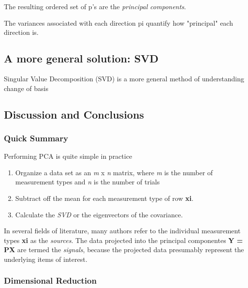 The resulting ordered set of p's are the \emph{principal components}.

The variances associated with each direction pi quantify how "principal"
each direction is.

\hypertarget{a-more-general-solution-svd}{%
\subsection{A more general solution:
SVD}\label{a-more-general-solution-svd}}

Singular Value Decomposition (SVD) is a more general method of
understanding change of basis

\hypertarget{discussion-and-conclusions}{%
\subsection{Discussion and
Conclusions}\label{discussion-and-conclusions}}

\hypertarget{quick-summary}{%
\subsubsection{Quick Summary}\label{quick-summary}}

Performing PCA is quite simple in practice

\begin{enumerate}
\def\labelenumi{\arabic{enumi}.}
\item
  Organize a data set as an \emph{m} x \emph{n} matrix, where \emph{m}
  is the number of measurement types and \emph{n} is the number of
  trials
\item
  Subtract off the mean for each measurement type of row \textbf{xi}.
\item
  Calculate the \emph{SVD} or the eigenvectors of the covariance.
\end{enumerate}

In several fields of literature, many authors refer to the individual
measurement types \textbf{xi} as the \emph{sources}. The data projected
into the principal componentes \textbf{Y = PX} are termed the
\emph{signals}, because the projected data presumably represent the
underlying items of interest.

\hypertarget{dimensional-reduction}{%
\subsubsection{Dimensional Reduction}\label{dimensional-reduction}}

